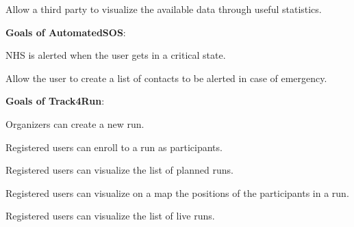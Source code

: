 \begin{goalList}
\begin{enumerate}[label={[}G3.\arabic*{]}]
    \item \label{goal:parties5}Allow a third party to visualize the available data through useful statistics.
    \newline
    
\end{enumerate}

\textbf{Goals of AutomatedSOS}:
\begin{enumerate}[label={[}G4.\arabic*{]}]

\item \label{goal:sos1}NHS is alerted when the user gets in a critical state.
\item \label{goal:sos2}Allow the user to create a list of contacts to be alerted in case of emergency.
    
\end{enumerate}
\newpage

\textbf{Goals of Track4Run}:
\begin{enumerate}[label={[}G5.\arabic*{]}]

    \item \label{goal:run1}Organizers can create a new run.
    \item \label{goal:run2}Registered users can enroll to a run as participants.
    \item \label{goal:run3}Registered users can visualize the list of planned runs.
    \item \label{goal:run4}Registered users can visualize on a map the positions of the participants in a run.
    \item\label{goal:run5}Registered users can visualize the list of live runs.
    
\end{enumerate}
\end{goalList}
